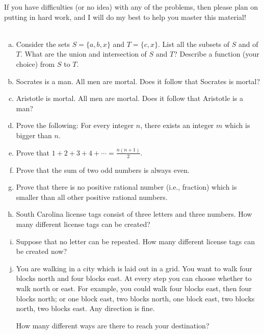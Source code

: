 \documentclass[12pt]{article}
\begin{document}
If you have difficulties (or no idea) with any of the problems, then please plan on putting in 
hard work, and I will do my best to help you master this material!
\\
\\
\begin{enumerate}[(a)]
\item 
Consider the sets $S = \{a, b, x\}$ and $T = \{c, x\}$. 
List all the subsets of $S$ and of $T$. What are the union and intersection of $S$ and $T$?
Describe a function (your choice) from $S$ to $T$.

\item
Socrates is a man. All men are mortal. Does it follow that Socrates is mortal?

\item
Aristotle is mortal. All men are mortal. Does it follow that Aristotle is a man?

\item
Prove the following: For every integer $n$, there exists an integer $m$ which is bigger than $n$.

\item
Prove that $1 + 2 + 3 + 4 + \cdots = \frac{n(n + 1)}{2}$.

\item
Prove that the sum of two odd numbers is always even.

\item
Prove that there is no positive rational number (i.e., fraction) which is smaller than all other positive rational
numbers.

\item
South Carolina license tags consist of three letters and three numbers. How many different
license tags can be created?

\item
Suppose that no letter can be repeated. How many different license tags can be created now?

\item
You are walking in a city which is laid out in a grid. You want to walk four blocks north and
four blocks east. At every step you can choose whether to walk north or east. For example, you could
walk four blocks east, then four blocks north; or one block east, two blocks north, one block east,
two blocks north, two blocks east. Any direction is fine.

How many different ways are there to reach your destination?

\end{enumerate}
\end{document}
